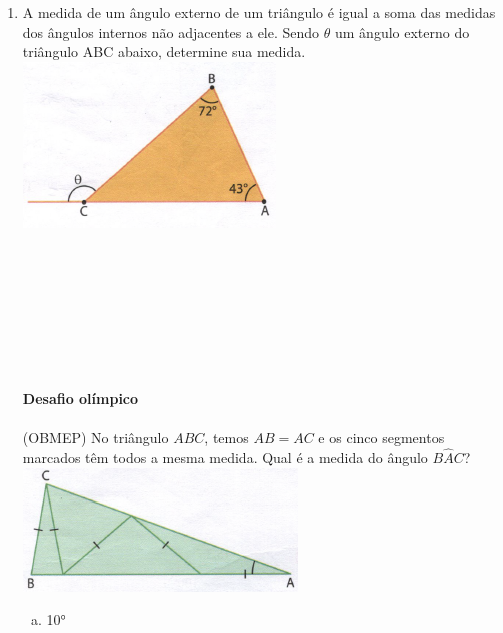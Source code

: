 \documentclass[a4paper,14pt]{article}
\begin{document}
\begin{multicols}{2}
\begin{enumerate}
			\item A medida de um ângulo externo de um triângulo é igual a soma das medidas dos ângulos internos não adjacentes a ele. Sendo $\theta$ um ângulo externo do triângulo ABC abaixo, determine sua medida. \\
			\includegraphics[width=1\linewidth]{6FMA124_imagens/imagem7} \\\\\\\\\\\\\\\\\\
			\textbf{Desafio olímpico} \\\\
			(OBMEP) No triângulo $ABC$, temos $AB = AC$ e os cinco segmentos marcados têm todos a mesma medida. Qual é a medida do ângulo $B$$\hat{A}C$? \\
			\includegraphics[width=1\linewidth]{6FMA124_imagens/imagem8}
			\begin{enumerate}[a)]
				\item 10°

\end{enumerate}$$
\end{enumerate}
\end{multicols}
\end{document}
